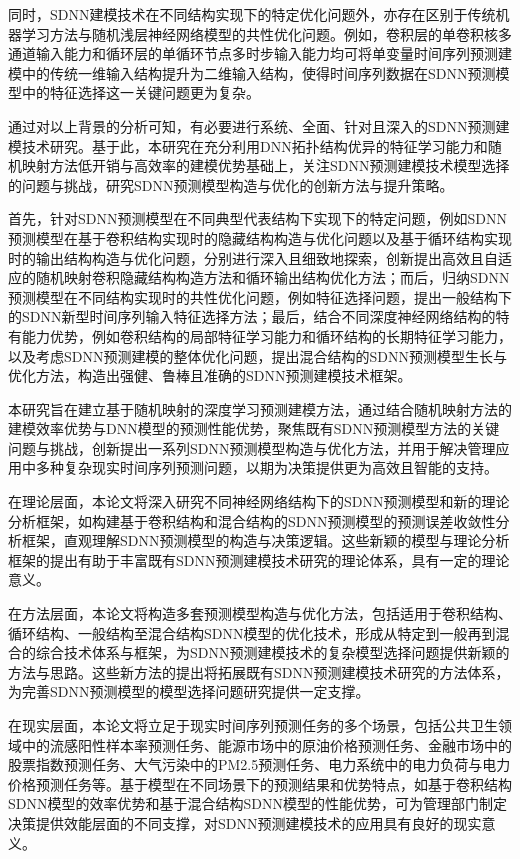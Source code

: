 同时，SDNN建模技术在不同结构实现下的特定优化问题外，亦存在区别于传统机器学习方法与随机浅层神经网络模型的共性优化问题。例如，卷积层的单卷积核多通道输入能力\cite{wangTraffic2016}和循环层的单循环节点多时步输入能力\cite{bandaraForecasting2020}均可将单变量时间序列预测建模中的传统一维输入结构提升为二维输入结构，使得时间序列数据在SDNN预测模型中的特征选择这一关键问题更为复杂。


通过对以上背景的分析可知，有必要进行系统、全面、针对且深入的SDNN预测建模技术研究。基于此，本研究在充分利用DNN拓扑结构优异的特征学习能力和随机映射方法低开销与高效率的建模优势基础上，关注SDNN预测建模技术模型选择的问题与挑战，研究SDNN预测模型构造与优化的创新方法与提升策略。

首先，针对SDNN预测模型在不同典型代表结构下实现下的特定问题，例如SDNN预测模型在基于卷积结构实现时的隐藏结构构造与优化问题以及基于循环结构实现时的输出结构构造与优化问题，分别进行深入且细致地探索，创新提出高效且自适应的随机映射卷积隐藏结构构造方法和循环输出结构优化方法；而后，归纳SDNN预测模型在不同结构实现时的共性优化问题，例如特征选择问题，提出一般结构下的SDNN新型时间序列输入特征选择方法；最后，结合不同深度神经网络结构的特有能力优势，例如卷积结构的局部特征学习能力和循环结构的长期特征学习能力，以及考虑SDNN预测建模的整体优化问题，提出混合结构的SDNN预测模型生长与优化方法，构造出强健、鲁棒且准确的SDNN预测建模技术框架。

本研究旨在建立基于随机映射的深度学习预测建模方法，通过结合随机映射方法的建模效率优势与DNN模型的预测性能优势，聚焦既有SDNN预测模型方法的关键问题与挑战，创新提出一系列SDNN预测模型构造与优化方法，并用于解决管理应用中多种复杂现实时间序列预测问题，以期为决策提供更为高效且智能的支持。

在理论层面，本论文将深入研究不同神经网络结构下的SDNN预测模型和新的理论分析框架，如构建基于卷积结构和混合结构的SDNN预测模型的预测误差收敛性分析框架，直观理解SDNN预测模型的构造与决策逻辑。这些新颖的模型与理论分析框架的提出有助于丰富既有SDNN预测建模技术研究的理论体系，具有一定的理论意义。

在方法层面，本论文将构造多套预测模型构造与优化方法，包括适用于卷积结构、循环结构、一般结构至混合结构SDNN模型的优化技术，形成从特定到一般再到混合的综合技术体系与框架，为SDNN预测建模技术的复杂模型选择问题提供新颖的方法与思路。这些新方法的提出将拓展既有SDNN预测建模技术研究的方法体系，为完善SDNN预测模型的模型选择问题研究提供一定支撑。

在现实层面，本论文将立足于现实时间序列预测任务的多个场景，包括公共卫生领域中的流感阳性样本率预测任务、能源市场中的原油价格预测任务、金融市场中的股票指数预测任务、大气污染中的PM2.5预测任务、电力系统中的电力负荷与电力价格预测任务等。基于模型在不同场景下的预测结果和优势特点，如基于卷积结构SDNN模型的效率优势和基于混合结构SDNN模型的性能优势，可为管理部门制定决策提供效能层面的不同支撑，对SDNN预测建模技术的应用具有良好的现实意义。

